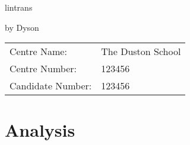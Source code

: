 \documentclass[a4paper]{article}
\begin{document}

\begin{center}
	\vspace*{6.5cm}

	\Huge{\hackfont lintrans}

	\vspace{0.8cm}

	\Large{by Dyson}

	\vfill
\end{center}

\large{
\begin{tabular}{ll}
Centre Name:& The Duston School\\
Centre Number:& 123456\\
Candidate Number:& 123456
\end{tabular}
}

\thispagestyle{empty}
\newpage



\thispagestyle{fancy}
\cfoot{\thepage}

\tableofcontents
\newpage



\setlength{\parindent}{0em}
\setlength{\parskip}{1em}



\section{Analysis}




\newpage


\printbibliography

\end{document}
